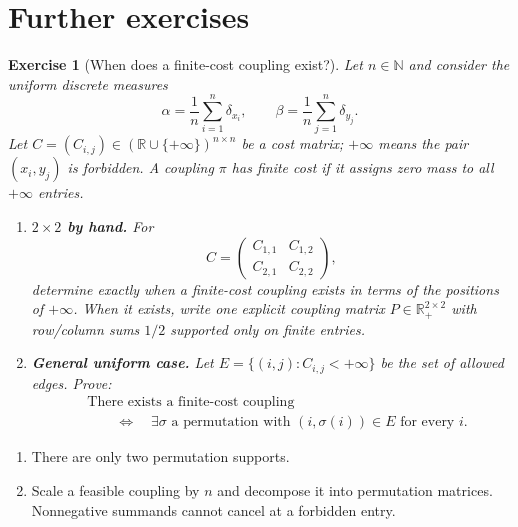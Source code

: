 \documentclass[11pt,a4paper]{article}
\theoremstyle{exostyle}
\newtheorem{exercise}{Exercise}
\newcommand{\R}{\mathbb{R}}
\begin{document}
\section*{Further exercises}

\begin{exercise}[When does a finite-cost coupling exist?]\label{ex:finite-feasibility-compact}
Let $n\in\mathbb N$ and consider the uniform discrete measures
\[
\alpha=\frac1n\sum_{i=1}^n \delta_{x_i},\qquad
\beta=\frac1n\sum_{j=1}^n \delta_{y_j}.
\]
Let $C=(C_{i,j})\in(\mathbb R\cup\{+\infty\})^{n\times n}$ be a cost matrix; $+\infty$ means the pair $(x_i,y_j)$ is forbidden. A coupling $\pi$ has \emph{finite cost} if it assigns zero mass to all $+\infty$ entries.

\begin{enumerate}[label=(\roman*), itemsep=4pt]
\item \textbf{$2\times2$ by hand.} For
\[
C=\begin{pmatrix}C_{1,1}&C_{1,2}\\ C_{2,1}&C_{2,2}\end{pmatrix},
\]
determine exactly when a finite-cost coupling exists in terms of the positions of $+\infty$. When it exists, write one explicit coupling matrix $P\in\R_+^{2\times2}$ with row/column sums $1/2$ supported only on finite entries.

\item \textbf{General uniform case.} Let $E=\{(i,j): C_{i,j}<+\infty\}$ be the set of allowed edges. Prove:
\[
\begin{aligned}
&\text{There exists a finite-cost coupling}\\
&\qquad\Longleftrightarrow\quad
\exists\sigma\text{ a permutation with }(i,\sigma(i))\in E\text{ for every }i.
\end{aligned}
\]

\end{enumerate}
\end{exercise}
\begin{hints}
\begin{enumerate}[label=(\roman*)]\item There are only two permutation supports.\item Scale a feasible coupling by $n$ and decompose it into permutation matrices. Nonnegative summands cannot cancel at a forbidden entry.\end{enumerate}
\end{hints}
\end{document}
